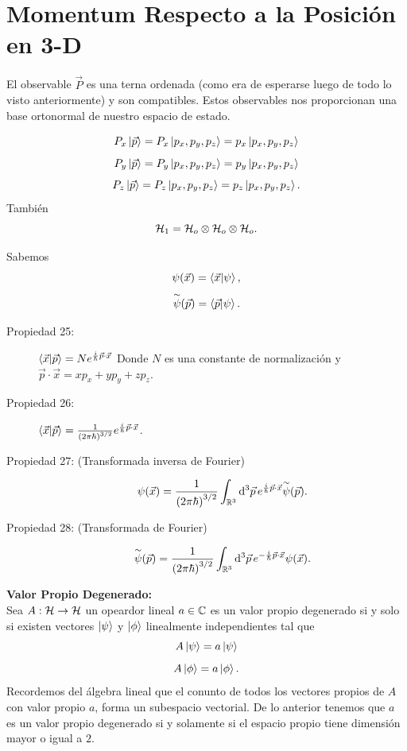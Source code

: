 \section{Momentum Respecto a la Posición en 3-D}
El observable $\vec{P}$ es una terna ordenada (como era de esperarse luego de todo lo visto anteriormente) y son compatibles. Estos observables nos proporcionan una base ortonormal de nuestro espacio de estado. 

\begin{tcolorbox}
        $$ P_x \ket{\vec{p}} = P_x \ket{p_x,p_y,p_z} = p_x \ket{p_x,p_y,p_z} $$
        $$ P_y \ket{\vec{p}} = P_y \ket{p_x,p_y,p_z} = p_y \ket{p_x,p_y,p_z} $$
        $$ P_z \ket{\vec{p}} = P_z \ket{p_x,p_y,p_z} = p_z \ket{p_x,p_y,p_z}. $$
    También
        $$ \mathcal{H} _1 = \mathcal{H} _o \otimes \mathcal{H} _o \otimes \mathcal{H} _o. $$
\end{tcolorbox}

Sabemos
	$$ \psi (\vec{x}) = \braket{\vec{x}}{\psi}, $$
	$$ \overset{\sim}{\psi} (\vec{p}) = \braket{\vec{p}}{\psi}. $$

\begin{description}
	\item[Propiedad 25: ] $\braket{\vec{x}}{\vec{p}} = N e^{\frac{i}{\hbar} \vec{p} \cdot \vec{x}}$ Donde $N$ es una constante de normalización y $\vec{p} \cdot \vec{x} = xp_x + yp_y + zp_z$.
	\item[Propiedad 26: ] $\braket{\vec{x}}{\vec{p}} = \frac{1}{\qty(2\pi \hbar)^{3/2}} e^{\frac{i}{\hbar} \vec{p} \cdot \vec{x}}$.
	\item[Propiedad 27: (Transformada inversa de Fourier)] 
		$$ \psi (\vec{x}) = \frac{1}{\qty(2\pi \hbar)^{3/2}} \int _{\mathbb{R}^3} \dd{^3 \vec{p}} e^{\frac{i}{\hbar} \vec{p} \cdot \vec{x}} \overset{\sim}{\psi} (\vec{p}). $$
	\item[Propiedad 28: (Transformada de Fourier)] 
		$$ \overset{\sim}{\psi} (\vec{p}) = \frac{1}{\qty(2\pi \hbar)^{3/2}} \int _{\mathbb{R}^3} \dd{^3 \vec{p}} e^{-\frac{i}{\hbar} \vec{p} \cdot \vec{x}} \psi (\vec{x}). $$
\end{description}


\begin{definition}
	\textbf{Valor Propio Degenerado: } \\
	Sea $A:\mathcal{H} \to \mathcal{H}$ un opeardor lineal $a\in \mathbb{C}$ es un valor propio degenerado si y solo si existen vectores $\ket{\psi}$ y $\ket{\phi}$ linealmente independientes tal que 
		$$ A\ket{\psi} = a\ket{\psi} $$
		$$ A\ket{\phi} = a\ket{\phi}. $$
	Recordemos del álgebra lineal que el conunto de todos los vectores propios de $A$ con valor propio $a$, forma un subespacio vectorial. De lo anterior tenemos que $a$ es un valor propio degenerado si y solamente si el espacio propio tiene dimensión mayor o igual a $2$.
\end{definition}


